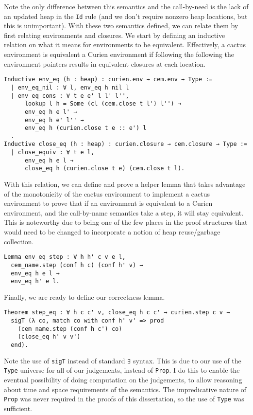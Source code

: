 Note the only difference between this semantics and the call-by-need is the lack
of an updated heap in the \texttt{Id} rule (and we don't require nonzero heap
locations, but this is unimportant). With these two semantics defined, we can
relate them by first relating environments and closures. We start by defining an
inductive relation on what it means for environments to be equivalent.
Effectively, a cactus environment is equivalent a Curien environment if
following the following the environment pointers results in equivalent closures
at each location. 

\begin{verbatim}
Inductive env_eq (h : heap) : curien.env → cem.env → Type := 
  | env_eq_nil : ∀ l, env_eq h nil l
  | env_eq_cons : ∀ t e e' l l' l'',
      lookup l h = Some (cl (cem.close t l') l'') →
      env_eq h e l' →
      env_eq h e' l'' →
      env_eq h (curien.close t e :: e') l
  .
Inductive close_eq (h : heap) : curien.closure → cem.closure → Type := 
  | close_equiv : ∀ t e l, 
      env_eq h e l → 
      close_eq h (curien.close t e) (cem.close t l).
\end{verbatim}

With this relation, we can define and prove a helper lemma that takes advantage
of the monotonicity of the cactus environment to implement a cactus environment
to prove that if an environment is equivalent to a Curien environment, and the
call-by-name \ce semantics take a step, it will stay equivalent. This is
noteworthy due to being one of the few places in the proof structures that would
need to be changed to incorporate a notion of heap reuse/garbage collection.

\begin{verbatim}
Lemma env_eq_step : ∀ h h' c v e l, 
  cem_name.step (conf h c) (conf h' v) →
  env_eq h e l → 
  env_eq h' e l.
\end{verbatim}

Finally, we are ready to define our correctness lemma.

\begin{verbatim}
Theorem step_eq : ∀ h c c' v, close_eq h c c' → curien.step c v →
  sigT (λ co, match co with conf h' v' => prod 
    (cem_name.step (conf h c') co)
    (close_eq h' v v') 
  end). 
\end{verbatim}

Note the use of \texttt{sigT} instead of standard \texttt{∃} syntax. This is due
to our use of the \texttt{Type} universe for all of our judgements, instead of
\texttt{Prop}. I do this to enable the eventual possibility of doing
computation on the judgements, to allow reasoning about time and space
requirements of the semantics. The impredicative nature of \texttt{Prop} was
never required in the proofs of this dissertation, so the use of \texttt{Type}
was sufficient. 
